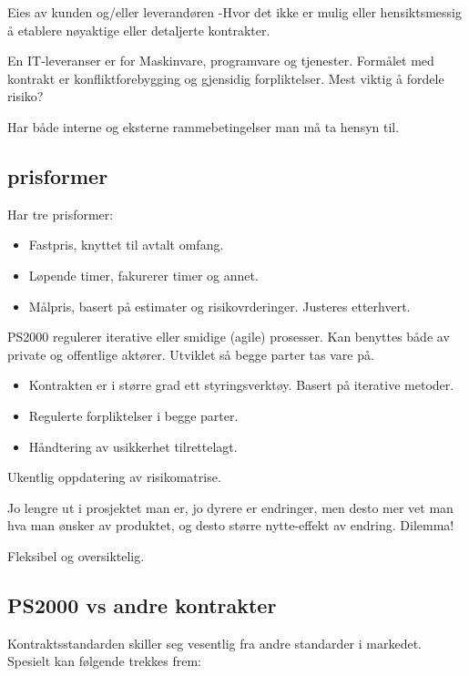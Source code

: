 \documentclass[11pt]{article}
\begin{document}
   Eies av kunden og/eller leverandøren
   -Hvor det ikke er mulig eller hensiktsmessig å etablere nøyaktige eller detaljerte kontrakter.

   En IT-leveranser er for Maskinvare, programvare og tjenester.
   Formålet med kontrakt er konfliktforebygging og gjensidig forpliktelser.
   Mest viktig å fordele risiko?

   Har både interne og eksterne rammebetingelser man må ta hensyn til.
\subsection{prisformer}
\label{sec-12.2}

   Har tre prisformer: 
\begin{itemize}
\item Fastpris, knyttet til avtalt omfang.
\item Løpende timer, fakurerer timer og annet.
\item Målpris, basert på estimater og risikovrderinger. Justeres etterhvert.
\end{itemize}

   PS2000 regulerer iterative eller smidige (agile) prosesser. 
   Kan benyttes både av private og offentlige aktører. Utviklet så begge parter tas vare på.

\begin{itemize}
\item Kontrakten er i større grad ett styringsverktøy. Basert på iterative metoder.
\item Regulerte forpliktelser i begge parter.
\item Håndtering av usikkerhet tilrettelagt.
\end{itemize}

  Ukentlig oppdatering av risikomatrise.

  Jo lengre ut i prosjektet man er, jo dyrere er endringer, 
  men desto mer vet man hva man ønsker av produktet, 
  og desto større nytte-effekt av endring. Dilemma!

  Fleksibel og oversiktelig.
\subsection{PS2000 vs andre kontrakter}
\label{sec-12.3}


   Kontraktsstandarden skiller seg vesentlig fra andre standarder i markedet. 
   Spesielt kan følgende trekkes frem: 
\end{document}

